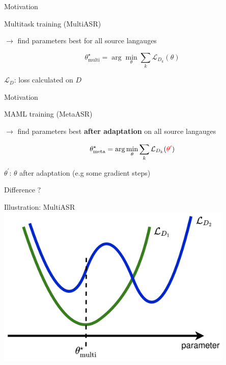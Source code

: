 \documentclass{beamer}
\begin{document}
\begin{frame}[t]{Motivation}
	\begin{center}
    \LARGE{Multitask training (MultiASR)}
	\end{center}
  \vspace{3em}
  $\rightarrow$ find parameters best for all source langauges

  \begin{equation*}
    \theta_{\text{multi}}^\star = \arg \min_\theta \sum_k \mathcal{L}_{D_k}(\theta)
  \end{equation*}

  $\mathcal{L}_D$: loss calculated on $D$
\end{frame}

\begin{frame}[t]{Motivation}
	\begin{center}
    \LARGE{MAML training (MetaASR)}
	\end{center}
  \vspace{3em}
  $\rightarrow$ find parameters best \textbf{after adaptation} on all source langauges

  \begin{equation*}
    \theta_{\text{meta}}^\star = \arg \min_\theta \sum_k \mathcal{L}_{D_k}(\textcolor{red}{\theta^\prime})
  \end{equation*}

  $\theta^\prime$: $\theta$ after adaptation (e.g some gradient steps) \\
  \flushright \hyperlink{overview of maml}{}
\end{frame}

\begin{frame}
	\begin{center}
    \LARGE{Difference ?}
	\end{center}
\end{frame}

\begin{frame}[t]{Illustration: MultiASR}
  \center \includegraphics[width=0.85\textwidth]{fig/multi_illustration.png}
\end{frame}
\end{document}
